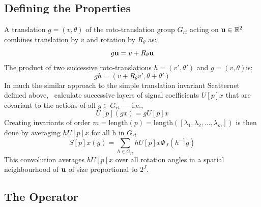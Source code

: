 \subsection{Defining the Properties}
  A translation $g = (v, \theta)$ of the roto-translation group $G_{rt}$ acting on
  $\mathbf{u} \in \mathbb{R}^2$ combines translation by $v$ and rotation by
  $R_{\theta}$ as:
  \begin{equation}
    g\mathbf{u} = v + R_{\theta}\mathbf{u}
  \end{equation}
  The product of two successive roto-translations $h=(v',
  \theta ')$ and $g = (v, \theta) $is:
  \begin{equation}
    gh = (v + R_{\theta}v', \theta + \theta')
  \end{equation}
  In much the similar approach to the simple translation invariant Scatternet defined
  above, \Bruna\ calculate successive layers of signal coefficients $U[p]x$ that
  are covariant to the actions of all $g \in G_{rt}$ --- i.e.,\ 
  \begin{equation}
    U[p](gx) = gU[p]x
  \end{equation}
  Creating invariants of order $m = \mathrm{length}(p)
  = \mathrm{length}([\lambda_1, \lambda_2, \ldots, \lambda_m])$ is then done by
  averaging $hU[p]x$ for all h in $G_{rt}$
  \begin{equation}
    S[p]x(g) = \sum_{h \in G_{rt}} hU[p]x \Phi_J(h^{-1}g)
  \end{equation}
  This convolution averages $hU[p]x$ over all rotation angles in a spatial
  neighbourhood of $\mathbf{u}$ of size proportional to $2^J$.

\subsection{The Operator}
